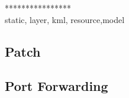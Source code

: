 ****************\\
static, layer, kml, resource,model\\

\subsection{Patch}

\subsection{Port Forwarding}

